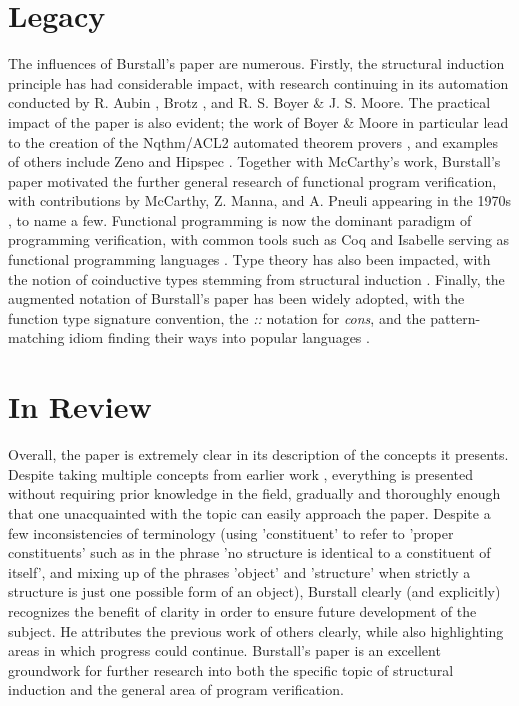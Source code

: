 \documentclass[11pt]{article}
\begin{document}
\section{Legacy}

The influences of Burstall's paper are numerous. Firstly, the structural
induction principle has had considerable impact, with research continuing in its
automation conducted by R. Aubin \cite{aubin1979mechanizing}, Brotz
\cite{brotz1974embedding}, and R. S. Boyer \& J. S. Moore. The practical impact
of the paper is also evident; the work of Boyer \& Moore in particular lead to
the creation of the Nqthm/ACL2 automated theorem provers \cite{acl2}, and
examples of others include Zeno and Hipspec \cite{claessen2012hipspec}. Together
with McCarthy's work, Burstall's paper motivated the further general research of
functional program verification, with contributions by McCarthy, Z. Manna, and
A. Pneuli appearing in the 1970s \cite{manna1969properties}
\cite{manna1970formalization}, to name a few. Functional programming is now the
dominant paradigm of programming verification, with common tools such as Coq
and Isabelle serving as functional programming languages
\cite{yushkovskiy2018comparison}. Type theory has also been impacted, with the
notion of coinductive types stemming from structural induction
\cite{gimenez1998structural}. Finally, the augmented notation of Burstall's
paper has been widely adopted, with the function type signature convention, the
\textit{::} notation for \textit{cons}, and the pattern-matching idiom finding
their ways into popular languages \cite{ullman1994elements}.


\section{In Review}

Overall, the paper is extremely clear in its description of the concepts it
presents. Despite taking multiple concepts from earlier work
\cite{mccarthy1963basis} \cite{curry1958combinatory}, everything is presented
without requiring prior knowledge in the field, gradually and thoroughly enough
that one unacquainted with the topic can easily approach the paper. Despite a
few inconsistencies of terminology (using 'constituent' to refer to 'proper
constituents' such as in the phrase 'no structure is identical to a constituent
of itself', and mixing up of the phrases 'object' and 'structure' when strictly
a structure is just one possible form of an object), Burstall clearly (and
explicitly) recognizes the benefit of clarity in order to ensure future
development of the subject. He attributes the previous work of others clearly,
while also highlighting areas in which progress could continue. Burstall's paper
is an excellent groundwork for further research into both the specific topic of
structural induction and the general area of program verification.


 

\end{document}
